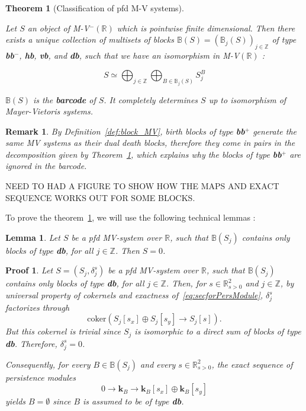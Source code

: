 \documentclass[a4paper, english, 11pt]{article}
\newcommand{\kk}[0]{\textbf{k}}
\newcommand{\0}{\vec{0}}
\newcommand{\R}[0]{\mathbb{R}}
\newcommand{\Z}[0]{\mathbb{Z}}
\newtheorem*{pf}{Proof} }
\newtheorem{remark}[prop]{Remark}
\newtheorem{lem}[prop]{Lemma}
\newtheorem{thm}[prop]{Theorem}
\begin{document}
\begin{thm}[Classification of pfd M-V systems]\label{thm:decom_MV}

Let $S$ an object of M-V$^- (\R)$ which is pointwise finite dimensional.  Then there exists a unique collection of multisets of blocks $\mathbb{B}(S) = (\mathbb{B}_j(S))_{j\in \Z}$ of type \textbf{bb$^-$}, \textbf{hb}, \textbf{vb}, and \textbf{db}, such that we have an isomorphism in M-V$(\R)$ : 

$$S \simeq \bigoplus_{j\in \Z} \bigoplus_{B\in \mathbb{B}_j(S)} S_j^B $$

$\mathbb{B}(S)$ is the \textbf{barcode} of $S$. It completely determines $S$ up to isomorphism of Mayer-Vietoris systems.
\end{thm}

\begin{remark}
By Definition~\ref{def:block_MV}, birth blocks of type \textbf{bb$^+$} generate the same MV systems as their dual death blocks, therefore  they come in pairs in the decomposition given by Theorem~\ref{thm:decom_MV}, which explains why the blocks of type \textbf{bb$^+$} are ignored in the barcode.
\end{remark}
NEED TO HAD A FIGURE TO SHOW HOW THE MAPS AND EXACT SEQUENCE WORKS OUT FOR SOME BLOCKS.

To prove the theorem~\ref{thm:decom_MV}, we will use the following technical lemmas :

\begin{lem}
Let $S$ be a pfd MV-system over $\R$, such that $\mathbb{B}(S_j)$ contains only blocks of type \textbf{db}, for all $j\in \Z$. Then $S = 0$.

\end{lem}

\begin{pf}
Let $S = (S_j,\delta_j^s)$ be  a pfd MV-system over $\R$, such that $\mathbb{B}(S_j)$ contains only blocks of type \textbf{db}, for all $j\in \Z$. Then, for $s\in \R^2_{s>0}$ and $j\in\Z$, by universal property of cokernels and exactness of~\eqref{eq:secforPersModule}, $\delta^s_j$ factorizes through $$\text{coker}\left (S_j[s_x] \oplus S_j[s_y] \longrightarrow S_j[s] \right ).$$
But this cokernel is trivial 
since $S_j$ is isomorphic to a direct sum of blocks of type \textbf{db}. Therefore, $\delta^s_j = 0$.

Consequently, for every $B\in \mathbb{B}(S_j)$ and every $s\in \R^2_{s>0}$, the exact sequence of persistence modules 
$$0 \longrightarrow \kk_B \longrightarrow \kk_B[s_x] \oplus \kk_B[s_y] $$
yields $B = \emptyset$ since $B$ is assumed to be of type \textbf{db}.
\end{pf}
\end{document}
